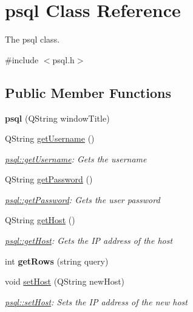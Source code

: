 \hypertarget{classpsql}{}\section{psql Class Reference}
\label{classpsql}


The psql class.  




{\ttfamily \#include $<$psql.\+h$>$}

\subsection*{Public Member Functions}
\begin{DoxyCompactItemize}
\item 
\mbox{\label{classpsql_aaff5fe0931dce097850982e44e6361af}} 
{\bfseries psql} (Q\+String window\+Title)
\item 
Q\+String \hyperlink{classpsql_aecc9fd93dc5ca0c4f4a63d445a36d166}{get\+Username} ()
\begin{DoxyCompactList}\small\item\em \hyperlink{classpsql_aecc9fd93dc5ca0c4f4a63d445a36d166}{psql\+::get\+Username}\+: Gets the username \end{DoxyCompactList}\item 
Q\+String \hyperlink{classpsql_a817e5a88f877cac6f843c1e743aec096}{get\+Password} ()
\begin{DoxyCompactList}\small\item\em \hyperlink{classpsql_a817e5a88f877cac6f843c1e743aec096}{psql\+::get\+Password}\+: Gets the user password \end{DoxyCompactList}\item 
Q\+String \hyperlink{classpsql_a95d06ee661db0b9cf72605b983b04613}{get\+Host} ()
\begin{DoxyCompactList}\small\item\em \hyperlink{classpsql_a95d06ee661db0b9cf72605b983b04613}{psql\+::get\+Host}\+: Gets the IP address of the host \end{DoxyCompactList}\item 
\mbox{\label{classpsql_a3aefa56fba453cffe18c3ae9d94af092}} 
int {\bfseries get\+Rows} (string query)
\item 
void \hyperlink{classpsql_a96b3b9483f1a642c026d4b5cf505eb75}{set\+Host} (Q\+String new\+Host)
\begin{DoxyCompactList}\small\item\em \hyperlink{classpsql_a96b3b9483f1a642c026d4b5cf505eb75}{psql\+::set\+Host}\+: Sets the IP address of the new host \end{DoxyCompactList}\item 

\end{DoxyCompactItemize}
